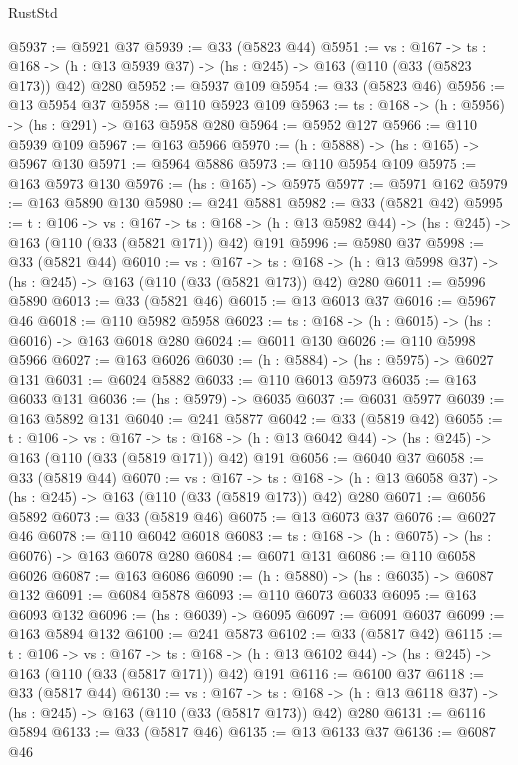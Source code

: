 \begin{lexlean}{RustStd}
\begin{coremodule}
@5937 := @5921 @37
@5939 := @33 (@5823 @44)
@5951 := {vs : @167} ->
  {ts : @168} -> (h : @13 @5939 @37) -> (hs : @245) -> @163 (@110 (@33 (@5823 @173)) @42) @280
@5952 := @5937 @109
@5954 := @33 (@5823 @46)
@5956 := @13 @5954 @37
@5958 := @110 @5923 @109
@5963 := {ts : @168} -> (h : @5956) -> (hs : @291) -> @163 @5958 @280
@5964 := @5952 @127
@5966 := @110 @5939 @109
@5967 := @163 @5966
@5970 := (h : @5888) -> (hs : @165) -> @5967 @130
@5971 := @5964 @5886
@5973 := @110 @5954 @109
@5975 := @163 @5973 @130
@5976 := (hs : @165) -> @5975
@5977 := @5971 @162
@5979 := @163 @5890 @130
@5980 := @241 @5881
@5982 := @33 (@5821 @42)
@5995 := {t : @106} ->
  {vs : @167} ->
  {ts : @168} -> (h : @13 @5982 @44) -> (hs : @245) -> @163 (@110 (@33 (@5821 @171)) @42) @191
@5996 := @5980 @37
@5998 := @33 (@5821 @44)
@6010 := {vs : @167} ->
  {ts : @168} -> (h : @13 @5998 @37) -> (hs : @245) -> @163 (@110 (@33 (@5821 @173)) @42) @280
@6011 := @5996 @5890
@6013 := @33 (@5821 @46)
@6015 := @13 @6013 @37
@6016 := @5967 @46
@6018 := @110 @5982 @5958
@6023 := {ts : @168} -> (h : @6015) -> (hs : @6016) -> @163 @6018 @280
@6024 := @6011 @130
@6026 := @110 @5998 @5966
@6027 := @163 @6026
@6030 := (h : @5884) -> (hs : @5975) -> @6027 @131
@6031 := @6024 @5882
@6033 := @110 @6013 @5973
@6035 := @163 @6033 @131
@6036 := (hs : @5979) -> @6035
@6037 := @6031 @5977
@6039 := @163 @5892 @131
@6040 := @241 @5877
@6042 := @33 (@5819 @42)
@6055 := {t : @106} ->
  {vs : @167} ->
  {ts : @168} -> (h : @13 @6042 @44) -> (hs : @245) -> @163 (@110 (@33 (@5819 @171)) @42) @191
@6056 := @6040 @37
@6058 := @33 (@5819 @44)
@6070 := {vs : @167} ->
  {ts : @168} -> (h : @13 @6058 @37) -> (hs : @245) -> @163 (@110 (@33 (@5819 @173)) @42) @280
@6071 := @6056 @5892
@6073 := @33 (@5819 @46)
@6075 := @13 @6073 @37
@6076 := @6027 @46
@6078 := @110 @6042 @6018
@6083 := {ts : @168} -> (h : @6075) -> (hs : @6076) -> @163 @6078 @280
@6084 := @6071 @131
@6086 := @110 @6058 @6026
@6087 := @163 @6086
@6090 := (h : @5880) -> (hs : @6035) -> @6087 @132
@6091 := @6084 @5878
@6093 := @110 @6073 @6033
@6095 := @163 @6093 @132
@6096 := (hs : @6039) -> @6095
@6097 := @6091 @6037
@6099 := @163 @5894 @132
@6100 := @241 @5873
@6102 := @33 (@5817 @42)
@6115 := {t : @106} ->
  {vs : @167} ->
  {ts : @168} -> (h : @13 @6102 @44) -> (hs : @245) -> @163 (@110 (@33 (@5817 @171)) @42) @191
@6116 := @6100 @37
@6118 := @33 (@5817 @44)
@6130 := {vs : @167} ->
  {ts : @168} -> (h : @13 @6118 @37) -> (hs : @245) -> @163 (@110 (@33 (@5817 @173)) @42) @280
@6131 := @6116 @5894
@6133 := @33 (@5817 @46)
@6135 := @13 @6133 @37
@6136 := @6087 @46

\end{coremodule}
\end{lexlean}

